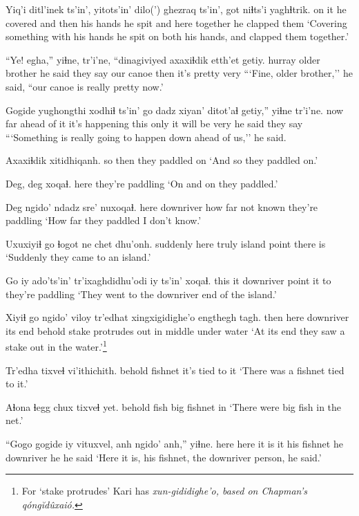 \documentclass[12pt]{article}
\begin{document}
\gll Yiq'i ditl'inek ts'in', yitots'in' dilo(')  ghezraq ts'in', got {niɬts'i} yaghɬtrik.
{on it} {he covered} and then {his hands} {he spit} and here together {he clapped them}
\glt `Covering something with his hands he spit on both his hands, and clapped them together.'
\glend

\gll ``Ye! egha,'' yiɬne, tr'i'ne, ``dinagiviyed axaxiɬdik etth'et getiy. 
hurray {older brother} {he said} {they say} {our canoe} then {it's pretty} very
\glt ```Fine, older brother,'' he said, ``our canoe is really pretty now.'
\glend

\gll Gogide yughongthi  xodhiɬ ts'in' {go dadz} xiyan' ditot'aɬ getiy,'' yiɬne tr'i'ne.
now {far ahead of it} {it's happening} {} this only {it will be} very {he said} {they say}
\glt ```Something is really going to happen down ahead of us,'' he said. 
\glend

\gll Axaxiɬdik xitidhiqanh.
{so then} {they paddled on}
\glt `And so they paddled on.'
\glend

\gll Deg, deg xoqaɬ.
here {} {they're paddling}
\glt `On and on they paddled.'
\glend

\gll Deg ngido' ndadz sre'  nuxoqaɬ.
here downriver {how far} {not known} {they're paddling}
\glt `How far they paddled I don't know.'
\glend

\gll Uxuxiyiɬ go ɬogot ne chet dhu'onh.
suddenly  here truly  island point {there is}
\glt `Suddenly they came to an island.'
\glend

\gll Go iy ado'ts'in' tr'ixaghdidhu'odi iy ts'in' xoqaɬ. 
this it downriver point  it to {they're paddling} 
\glt `They went to the downriver end of the island.'
\glend

\gll Xiyiɬ go ngido' viloy tr'edhat xingxigidighe'o engthegh tagh.
then here downriver {its end} behold  {stake protrudes} {out in middle} {under water}
\glt `At its end they saw a stake out in the water.'\footnote{For `stake protrudes' Kari has \em xun-gididighe'o, based on Chapman's \em q\'ong\u{i}d\^uxai\'o.}
\glend

\gll Tr'edha tixveɬ vi'ithichith.
behold  fishnet  {it's tied to it}
\glt `There was a fishnet tied to it.'
\glend

\gll Aɬona ɬegg chux tixveɬ yet.
behold  fish big fishnet  in
\glt `There were big fish in the net.'
\glend

\gll ``Gogo gogide iy vituxvel, anh ngido'  anh,'' yiɬne.
here {here it is} it {his fishnet} he downriver he {he said}
\glt `Here it is, his fishnet, the downriver person, he said.'
\glend
\end{document}
